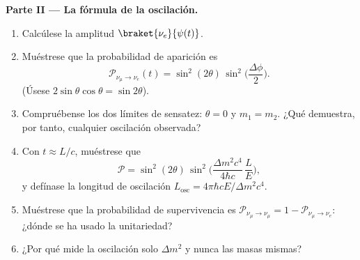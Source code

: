 \begin{problem}
\medskip\noindent\textbf{Parte II --- La fórmula de la oscilación.}
\begin{enumerate}[resume]
  \item Calcúlese la amplitud $\braket{\nu_e}{\psi(t)}$.
  \item Muéstrese que la probabilidad de aparición es
        \[
        \mathcal P_{\nu_\mu \to \nu_e}(t) =
        \sin^2(2\theta)\,\sin^2\Big(\frac{\Delta\phi}{2}\Big) .
        \]
        (Úsese $2\sin\theta\cos\theta = \sin2\theta$).
  \item Compruébense los dos límites de sensatez: $\theta = 0$ y $m_1 = m_2$.
        ¿Qué demuestra, por tanto, cualquier oscilación observada?
  \item Con $t \approx L/c$, muéstrese que
        \[
        \mathcal P = \sin^2(2\theta)\,
        \sin^2\Big(\frac{\Delta m^2c^4}{4\hbar c}\,\frac{L}{E}\Big) ,
        \]
        y defínase la longitud de oscilación $L_{\text{osc}} =
        4\pi\hbar cE/\Delta m^2c^4$.
  \item Muéstrese que la probabilidad de supervivencia es $\mathcal P_{\nu_\mu \to
        \nu_\mu} = 1 - \mathcal P_{\nu_\mu\to\nu_e}$: ¿dónde se ha usado la
        unitariedad?
  \item ¿Por qué mide la oscilación solo $\Delta m^2$ y nunca las masas
        mismas?
\end{enumerate}


\end{problem}
